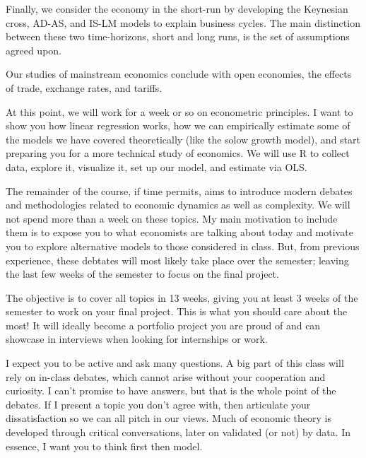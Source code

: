 \documentclass[10pt]{article}
\begin{document}
Finally, we consider the economy in the short-run by developing the Keynesian cross, AD-AS, and IS-LM models to explain business cycles. The main distinction between these two time-horizons, short and long runs, is the set of assumptions agreed upon.

Our studies of mainstream economics conclude with open economies, the effects of trade, exchange rates, and tariffs.

At this point, we will work for a week or so on econometric principles. I want to show you how linear regression works, how we can empirically estimate some of the models we have covered theoretically (like the solow growth model), and start preparing you for a more technical study of economics. We will use R to collect data, explore it, visualize it, set up our model, and estimate via OLS.

The remainder of the course, if time permits, aims to introduce modern debates and methodologies related to economic dynamics as well as complexity. We will not spend more than a week on these topics. My main motivation to include them is to expose you to what economists are talking about today and motivate you to explore alternative models to those considered in class. But, from previous experience, these debtates will most likely take place over the semester; leaving the last few weeks of the semester to focus on the final project.

The objective is to cover all topics in 13 weeks, giving you at least 3 weeks of the semester to work on your final project. This is what you should care about the most! It will ideally become a portfolio project you are proud of and can showcase in interviews when looking for internships or work.

I expect you to be active and ask many questions. A big part of this class will rely on in-class debates, which cannot arise without your cooperation and curiosity. I can't promise to have answers, but that is the whole point of the debates. If I present a topic you don't agree with, then articulate your dissatisfaction so we can all pitch in our views. Much of economic theory is developed through critical conversations, later on validated (or not) by data. In essence, I want you to think first then model.
\end{document}
